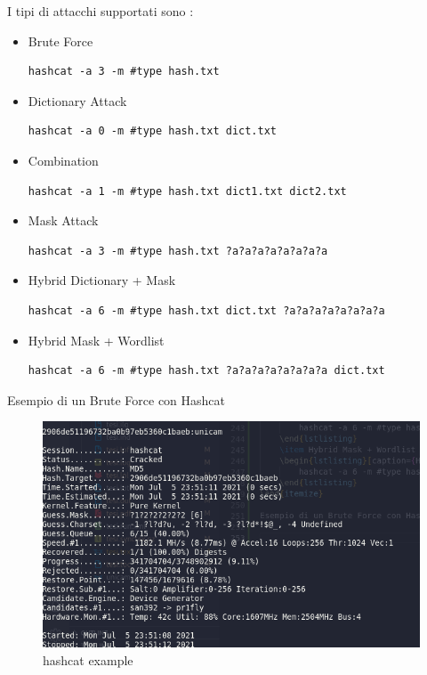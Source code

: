 I tipi di attacchi supportati sono :
\begin{itemize}
    \item Brute Force
          \begin{lstlisting}[caption={Hashcat Brute Force}, style=javaScriptCode]
        hashcat -a 3 -m #type hash.txt 
    \end{lstlisting}
    \item Dictionary Attack
          \begin{lstlisting}[caption={Hashcat Dictionary}, style=javaScriptCode]
        hashcat -a 0 -m #type hash.txt dict.txt 
    \end{lstlisting}
    \item Combination
          \begin{lstlisting}[caption={Hashcat Combination}, style=javaScriptCode]
        hashcat -a 1 -m #type hash.txt dict1.txt dict2.txt
    \end{lstlisting}
    \item Mask Attack
          \begin{lstlisting}[caption={Hashcat Mask}, style=javaScriptCode]
        hashcat -a 3 -m #type hash.txt ?a?a?a?a?a?a?a?a
    \end{lstlisting}
    \item Hybrid Dictionary + Mask
          \begin{lstlisting}[caption={Hashcat Hybrid Dictionary + Mask}, style=javaScriptCode]
        hashcat -a 6 -m #type hash.txt dict.txt ?a?a?a?a?a?a?a?a
    \end{lstlisting}
    \item Hybrid Mask + Wordlist
          \begin{lstlisting}[caption={Hashcat Hybrid Mask + Wordlist}, style=javaScriptCode]
        hashcat -a 6 -m #type hash.txt ?a?a?a?a?a?a?a?a dict.txt
    \end{lstlisting}
\end{itemize}

Esempio di un Brute Force con Hashcat 

\begin{figure}[h!]
    \centering
    \includegraphics[width=\linewidth]{Immagini/1/hashcat_show.png}
    \caption{hashcat example}
    \label{fig:hashcat example}
\end{figure}


